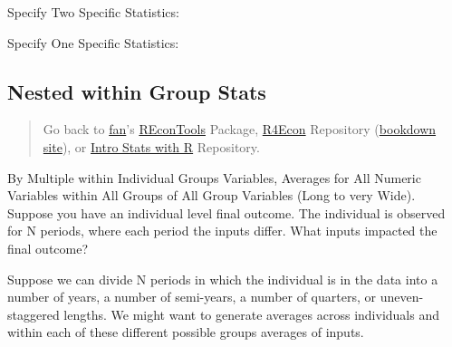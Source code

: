 \documentclass[
]{book}
\newenvironment{Shaded}{\begin{snugshade}}{\end{snugshade}}
\newcommand{\DataTypeTok}[1]{\textcolor[rgb]{0.13,0.29,0.53}{#1}}
\newcommand{\KeywordTok}[1]{\textcolor[rgb]{0.13,0.29,0.53}{\textbf{#1}}}
\newcommand{\NormalTok}[1]{#1}
\newcommand{\OperatorTok}[1]{\textcolor[rgb]{0.81,0.36,0.00}{\textbf{#1}}}
\newcommand{\StringTok}[1]{\textcolor[rgb]{0.31,0.60,0.02}{#1}}
\begin{document}
Specify Two Specific Statistics:

\begin{Shaded}
\end{Shaded}

Specify One Specific Statistics:

\begin{Shaded}
\end{Shaded}

\hypertarget{nested-within-group-stats}{%
\subsection{Nested within Group Stats}\label{nested-within-group-stats}}

\begin{quote}
Go back to \href{http://fanwangecon.github.io/}{fan}'s \href{https://fanwangecon.github.io/REconTools/}{REconTools} Package, \href{https://fanwangecon.github.io/R4Econ/}{R4Econ} Repository (\href{https://fanwangecon.github.io/R4Econ/bookdown}{bookdown site}), or \href{https://fanwangecon.github.io/Stat4Econ/}{Intro Stats with R} Repository.
\end{quote}

By Multiple within Individual Groups Variables, Averages for All Numeric Variables within All Groups of All Group Variables (Long to very Wide). Suppose you have an individual level final outcome. The individual is observed for N periods, where each period the inputs differ. What inputs impacted the final outcome?

Suppose we can divide N periods in which the individual is in the data into a number of years, a number of semi-years, a number of quarters, or uneven-staggered lengths. We might want to generate averages across individuals and within each of these different possible groups averages of inputs.
\end{document}
